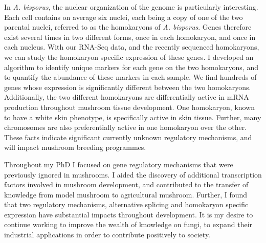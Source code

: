 \documentclass[letterpaper, 11pt]{article} %
\begin{document}
{\begin{minipage}[t]{0.9\textwidth}
  In \textit{A. bisporus}, the nuclear organization of the genome is particularly interesting.
  Each cell contains on average six nuclei, each being  a copy of one of the two parental nuclei, referred to as the homokaryons of \textit{A. bisporus}.
  Genes therefore exist several times in two different forms, once in each homokaryon, and once in each nucleus.
  With our RNA-Seq data, and the recently sequenced homokaryons, we can study the homokaryon specific expression of these genes.
  I developed an algorithm to identify unique markers for each gene on the two homokaryons, and to quantify the abundance of these markers in each sample.
  We find hundreds of genes whose expression is significantly different between the two homokaryons.
  Additionally, the two different homokaryons are differentially active in mRNA production throughout mushroom tissue development.
  One homokaryon, known to have a white skin phenotype, is specifically active in skin tissue.
  Further, many chromosomes are also preferentially active in one homokaryon over the other.
  These facts indicate significant currently unknown regulatory mechanisms, and will impact mushroom breeding programmes.

  Throughout my PhD I focused on gene regulatory mechanisms that were previously ignored in mushrooms.
  I aided the discovery of additional transcription factors involved in mushroom development, and contributed to the transfer of knowledge from model mushroom to agricultural mushroom.
  Further, I found that two regulatory mechanisms, alternative splicing and homokaryon specific expression have substantial impacts throughout development.
  It is my desire to continue working to improve the wealth of knowledge on fungi, to expand their industrial applications in order to contribute positively to society.

\end{minipage}
}


\thispagestyle{empty}
\end{document}
